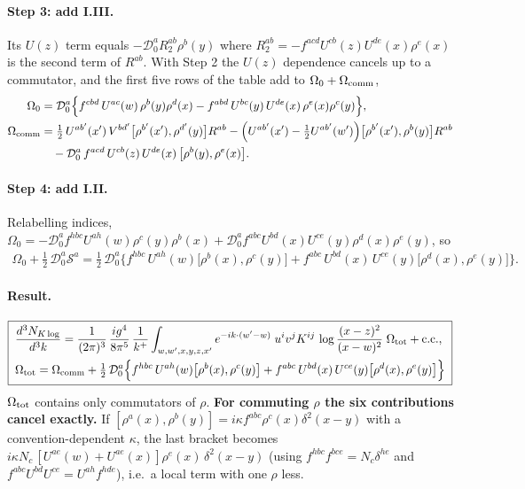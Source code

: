 \documentclass[10pt]{article}
\numberwithin{equation}{section}
\begin{document}
\paragraph{Step 3: add I.III.} Its $U(z)$ term equals $-\mathcal{D}_{0}^{a}R_{2}^{ab}\rho^{b}(y)$ where $R_{2}^{ab}=-f^{acd}U^{cb}(z)U^{de}(x)\rho^{e}(x)$ is the second term of $R^{ab}$. With Step 2 the $U(z)$ dependence cancels up to a commutator, and the first five rows of the table add to $\Omega_{0}+\Omega_{\rm comm}$,
\begin{align}
\Omega_{0}&=\mathcal{D}_{0}^{a}\Big\{f^{cbd}\,U^{ac}(w)\,\rho^{b}(y)\rho^{d}(x)-f^{abd}\,U^{bc}(y)\,U^{de}(x)\,\rho^{e}(x)\rho^{c}(y)\Big\},\\
\Omega_{\rm comm}&=\tfrac12\,U^{ab'}(x')\,V^{bd'}\big[\rho^{b'}(x'),\rho^{d'}(y)\big]R^{ab}
-\Big(U^{ab'}(x')-\tfrac12U^{ab'}(w')\Big)\big[\rho^{b'}(x'),\rho^{b}(y)\big]R^{ab}\notag\\
&\quad-\mathcal{D}_{0}^{a}\,f^{acd}\,U^{cb}(z)\,U^{de}(x)\,\big[\rho^{b}(y),\rho^{e}(x)\big].
\end{align}

\paragraph{Step 4: add I.II.} Relabelling indices, $\Omega_{0}=-\mathcal{D}_{0}^{a}f^{hbc}U^{ah}(w)\rho^{c}(y)\rho^{b}(x)+\mathcal{D}_{0}^{a}f^{abc}U^{bd}(x)U^{ce}(y)\rho^{d}(x)\rho^{e}(y)$, so
\begin{align}
\Omega_{0}+\tfrac12\,\mathcal{D}_{0}^{a}\mathcal{S}^{a}=\tfrac12\,\mathcal{D}_{0}^{a}\Big\{f^{hbc}\,U^{ah}(w)\big[\rho^{b}(x),\rho^{c}(y)\big]+f^{abc}\,U^{bd}(x)\,U^{ce}(y)\big[\rho^{d}(x),\rho^{e}(y)\big]\Big\}.
\end{align}

\paragraph{Result.}
\begin{align}
\boxed{\;\begin{aligned}
&\frac{d^{3}N_{K\log}}{d^{3}k}=\frac{1}{(2\pi)^{3}}\,\frac{ig^{4}}{8\pi^{5}}\,\frac{1}{k^{+}}\int_{w,w',x,y,z,x'}e^{-ik\cdot(w'-w)}\;u^{i}v^{j}K^{ij}\,\log\frac{(x-z)^{2}}{(x-w)^{2}}\;\Omega_{\rm tot}+{\rm c.c.},\\
&\Omega_{\rm tot}=\Omega_{\rm comm}+\tfrac12\,\mathcal{D}_{0}^{a}\Big\{f^{hbc}\,U^{ah}(w)\big[\rho^{b}(x),\rho^{c}(y)\big]+f^{abc}\,U^{bd}(x)\,U^{ce}(y)\big[\rho^{d}(x),\rho^{e}(y)\big]\Big\}
\end{aligned}\;} \label{eq:Omegatot}
\end{align}
$\Omega_{\rm tot}$ contains only commutators of $\rho$. \textbf{For commuting $\rho$ the six contributions cancel exactly.} If $[\rho^{a}(x),\rho^{b}(y)]=i\kappa f^{abc}\rho^{c}(x)\delta^{2}(x-y)$ with a convention-dependent $\kappa$, the last bracket becomes $i\kappa N_{c}\,[U^{ae}(w)+U^{ae}(x)]\rho^{e}(x)\,\delta^{2}(x-y)$ (using $f^{hbc}f^{bce}=N_{c}\delta^{he}$ and $f^{abc}U^{bd}U^{ce}=U^{ah}f^{hde}$), i.e.\ a local term with one $\rho$ less.
\end{document}
